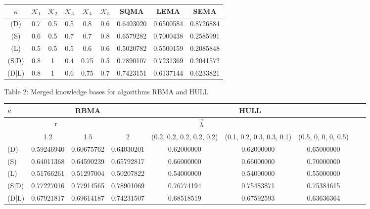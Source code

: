 \documentclass[]{iosart2c}
\begin{document}
\begin{table*}
\begin{tabular}{|c|c|c|c|c|c|c|c|c|}
\hline
$\kappa$ & $\mathcal{K}_1$ & $\mathcal{K}_2$ & $\mathcal{K}_3$ & $\mathcal{K}_4$ & $\mathcal{K}_5$ & SQMA & LEMA & SEMA\\
\hline
(D)   &  0.7 &  0.5 &  0.5 &  0.8   &  0.6 &  0.6403020 &  0.6500584 &  0.8726884 \\
(S)   &  0.6 &  0.5 &  0.7 &  0.7   &  0.8 &  0.6579282 &  0.7000438 &  0.2585991 \\
(L)   &  0.5 &  0.5 &  0.5 &  0.6   &  0.6 &  0.5020782 &  0.5500159 &  0.2085848 \\
(S|D) &  0.8 &  1   &  0.4 &  0.75  &  0.5 &  0.7890107 &  0.7231369 &  0.2041572 \\
(D|L) &  0.8 &  1   &  0.6 &  0.75  &  0.7 &  0.7423151 &  0.6137144 &  0.6233821 \\
\hline
\end{tabular}
\end{table*}

Table 2: Merged knowledge bases for algorithms RBMA and HULL

\begin{table*}
\begin{tabular}{|l|c|c|c|c|c|c|c|c|}
\hline
\multirow{3}{3em}{$\kappa$} & \multicolumn{3}{|c|}{RBMA} & \multicolumn{3}{|c|}{HULL}\\
\hline
\multicolumn{3}{|c|}{r} & \multicolumn{3}{|c|}{$\vec{\lambda}$}\\
\hline
      & 1.2        &   1.5       &   2  &  (0.2, 0.2, 0.2, 0.2, 0.2)& (0.1, 0.2, 0.3, 0.3, 0.1)&(0.5, 0, 0, 0, 0.5)\\
\hline
(D)   & 0.59246940 &  0.60675762 &  0.64030201 &  0.62000000        &       0.62000000         &      0.65000000\\
(S)   & 0.64011368 &  0.64590239 &  0.65792817 &  0.66000000        &       0.66000000         &      0.70000000\\
(L)   & 0.51766261 &  0.51297004 &  0.50207822 &  0.54000000        &       0.54000000         &      0.55000000\\
(S|D) & 0.77227016 &  0.77914565 &  0.78901069 &  0.76774194        &       0.75483871         &      0.75384615\\
(D|L) & 0.67921817 &  0.69614187 &  0.74231507 &  0.68518519        &       0.67592593         &      0.63636364\\
\end{tabular}
\end{table*}
\end{document}
